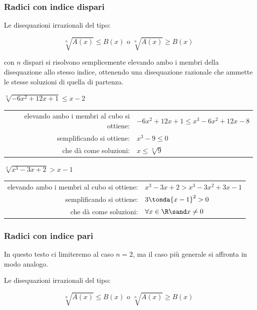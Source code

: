 \subsubsection{Radici con indice dispari}

Le disequazioni irrazionali del tipo:

\[\sqrt[n]{A(x)} \leqslant B(x) \text{ o } \sqrt[n]{A(x)} \geqslant B(x)\]

con \(n\) dispari si risolvono semplicemente elevando ambo i membri della 
disequazione allo stesso indice, ottenendo una disequazione razionale che 
ammette le stesse soluzioni di quella di partenza.

\begin{esempio}
\(\sqrt[3]{-6x^2 +12x +1} \leqslant x -2\)
\begin{center} \begin{tabular}{rl}
elevando ambo i membri al cubo si ottiene: & 
\(-6x^2 +12x +1 \leqslant x^3 -6x^2 +12x -8\)\\
semplificando si ottiene: & \(x^3 -9 \leqslant 0\)\\
che dà come soluzioni: & \(x \leqslant \sqrt[3]{9}\)
\end{tabular} \end{center}
\end{esempio}

\begin{esempio}
\(\sqrt[3]{x^3 -3x +2} > x -1\)
\begin{center} \begin{tabular}{rl}
elevando ambo i membri al cubo si ottiene: & 
\(x^3 -3x +2 > x^3 -3x^2 +3x -1\)\\
semplificando si ottiene: & \(3 \tonda{x -1}^2 > 0\)\\
che dà come soluzioni: & \(\forall x \in \R \sand x \neq 0\) 
\end{tabular} \end{center} 
\end{esempio}

\subsubsection{Radici con indice pari}

In questo testo ci limiteremo al caso \(n=2\), ma il caso più 
generale si affronta in modo analogo.

Le disequazioni irrazionali del tipo:

\[\sqrt[n]{A(x)} \leqslant B(x) \text{ o } \sqrt[n]{A(x)} \geqslant B(x)\]

